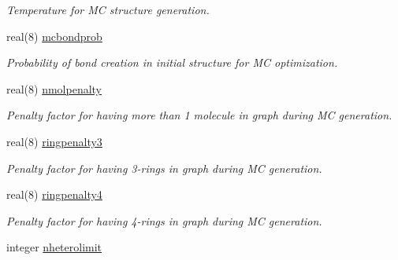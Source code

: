 \begin{DoxyCompactItemize}
\begin{DoxyCompactList}\small\item\em Temperature for MC structure generation. \end{DoxyCompactList}\item 
\mbox{\label{namespaceglobaldata_a9d74e3104ac2ba82b9fb1a987930be57}} 
real(8) \mbox{\hyperlink{namespaceglobaldata_a9d74e3104ac2ba82b9fb1a987930be57}{mcbondprob}}
\begin{DoxyCompactList}\small\item\em Probability of bond creation in initial structure for MC optimization. \end{DoxyCompactList}\item 
\mbox{\label{namespaceglobaldata_a40941aad7de0b0ee0c8567de84d5ce41}} 
real(8) \mbox{\hyperlink{namespaceglobaldata_a40941aad7de0b0ee0c8567de84d5ce41}{nmolpenalty}}
\begin{DoxyCompactList}\small\item\em Penalty factor for having more than 1 molecule in graph during MC generation. \end{DoxyCompactList}\item 
\mbox{\label{namespaceglobaldata_a619a149de3719f5708a15b15329fbae5}} 
real(8) \mbox{\hyperlink{namespaceglobaldata_a619a149de3719f5708a15b15329fbae5}{ringpenalty3}}
\begin{DoxyCompactList}\small\item\em Penalty factor for having 3-\/rings in graph during MC generation. \end{DoxyCompactList}\item 
\mbox{\label{namespaceglobaldata_aad02d1174d1ab3f06f84a3f5b812110b}} 
real(8) \mbox{\hyperlink{namespaceglobaldata_aad02d1174d1ab3f06f84a3f5b812110b}{ringpenalty4}}
\begin{DoxyCompactList}\small\item\em Penalty factor for having 4-\/rings in graph during MC generation. \end{DoxyCompactList}\item 
\mbox{\label{namespaceglobaldata_aaf605617930b57d1a3027a5e93e8473f}} 
integer \mbox{\hyperlink{namespaceglobaldata_aaf605617930b57d1a3027a5e93e8473f}{nheterolimit}}

\end{DoxyCompactItemize}
